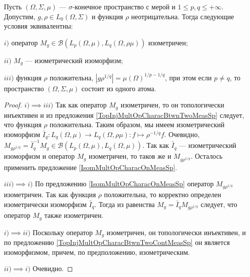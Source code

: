 \begin{proposition}\label{IsomMultOpCharacBtwnTwoContMeasSp} Пусть $(\Omega,\Sigma,\mu)$ --- $\sigma$-конечное пространство с мерой и $1\leq p,q\leq +\infty$. Допустим, $g,\rho\in L_0(\Omega,\Sigma)$ и функция $\rho$ неотрицательна. Тогда следующие условия эквивалентны:

$i)$ оператор $M_g\in\mathcal{B}(L_p(\Omega,\mu), L_q(\Omega,\rho \mu))$ изометричен;

$ii)$ $M_g$ --- изометрический изоморфизм;

$iii)$ функция $\rho$ положительна, $|g  \rho^{1/q}|=\mu(\Omega)^{1/p-1/q}$, при этом если $p\neq q$, то пространство $(\Omega,\Sigma,\mu)$ состоит из одного атома.
\end{proposition}
\begin{proof} $i)$$\implies$$ iii)$ Так как оператор $M_g$ изометричен, то он топологически инъективен и из предложения \ref{TopInjMultOpCharacBtwnTwoMeasSp} следует, что функция $\rho$ положительна. Таким образом, мы имеем изометрический изоморфизм $\bar{I}_q:L_q(\Omega,\mu)\to L_q(\Omega,\rho \mu):f\mapsto \rho^{-1/q}  f$. Очевидно, $M_{g \rho^{1/q}}=\bar{I}_q^{-1} M_g\in\mathcal{B}(L_p(\Omega,\mu),L_q(\Omega,\mu))$. Так как $\bar{I}_q$ --- изометрический изоморфизм и оператор $M_g$ изометричен, то таков же и $M_{g  \rho^{1/q}}$. Осталось применить предложение \ref{IsomMultOpCharacOnMeasSp}.

$iii)$$\implies$$ i)$ По предложению \ref{IsomMultOpCharacOnMeasSp} оператор $M_{g \rho^{1/q}}$ изометричен. Так как функция $\rho$ положительна, то корректно определен изометрически изоморфизм $\bar{I}_q$. Тогда из равенства $M_g=\bar{I}_q M_{g \rho^{1/q}}$ следует, что оператор $M_g$ также изометричен.

$i)$$\implies$$ ii)$ Поскольку оператор $M_g$ изометричен, он топологически инъективен, и по предложению \ref{TopInjMultOpCharacBtwnTwoContMeasSp} он является изоморфизмом, причем, по предположению, изометрическим.

$ii)$$\implies$$ i)$ Очевидно.
\end{proof}

